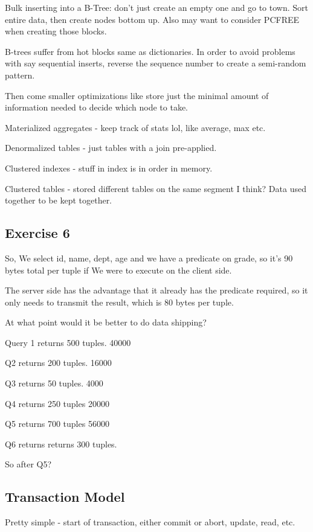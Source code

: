 \documentclass{article}
\begin{document}
		Bulk inserting into a B-Tree: don't just create an empty one and go to town. Sort entire data, then create nodes bottom up. Also may want to consider PCFREE when creating those blocks.
		
		B-trees suffer from hot blocks same as dictionaries. In order to avoid problems with say sequential inserts, reverse the sequence number to create a semi-random pattern.
		
		Then come smaller optimizations like store just the minimal amount of information needed to decide which node to take.
		
		Materialized aggregates - keep track of stats lol, like average, max etc.
		
		Denormalized tables - just tables with a join pre-applied.
		
		Clustered indexes - stuff in index is in order in memory.
		
		Clustered tables - stored different tables on the same segment I think? Data used together to be kept together.
		
	\subsection{Exercise 6}
	
		So, We select id, name, dept, age and we have a predicate on grade, so it's 90 bytes total per tuple if We were to execute on the client side.
		
		The server side has the advantage that it already has the predicate required, so it only needs to transmit the result, which is 80 bytes per tuple. 
		
		At what point would it be better to do data shipping?
		
		Query 1 returns 500 tuples. 40000
		
		Q2 returns 200 tuples. 16000
		
		Q3 returns 50 tuples. 4000
		
		Q4 returns 250 tuples 20000
		
		Q5 returns 700 tuples 56000
		
		Q6 returns returns 300 tuples.
		
		So after Q5? 
		
	\subsection{Transaction Model}
	
		Pretty simple - start of transaction, either commit or abort, update, read, etc.
		
\end{document}

